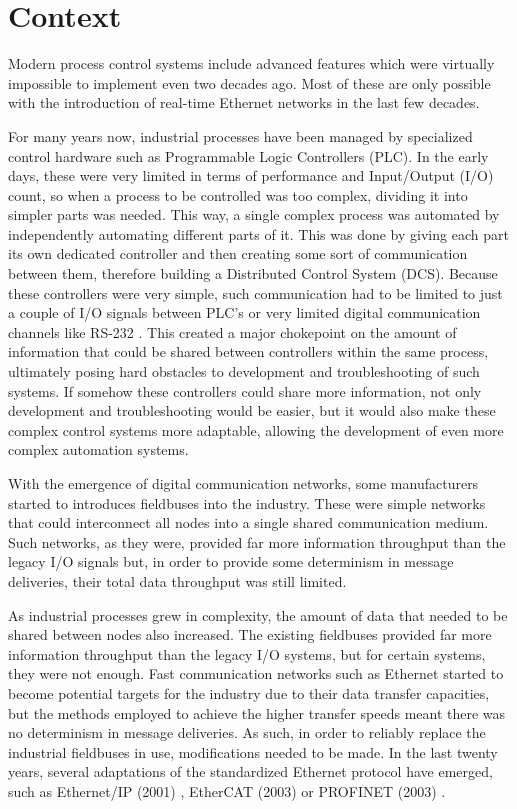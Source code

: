 \section{Context} \label{sec:context}

Modern process control systems include advanced features which were virtually impossible to implement even two decades ago.
Most of these are only possible with the introduction of real-time Ethernet networks in the last few decades.

For many years now, industrial processes have been managed by specialized control hardware such as Programmable Logic Controllers (PLC).
In the early days, these were very limited in terms of performance and Input/Output (I/O) count, so when a process to be controlled was too complex, dividing it into simpler parts was needed.
This way, a single complex process was automated by independently automating different parts of it.
This was done by giving each part its own dedicated controller and then creating some sort of communication between them, therefore building a Distributed Control System (DCS).
Because these controllers were very simple, such communication had to be limited to just a couple of I/O signals between PLC's or very limited digital communication channels like RS-232 \cite{protocol:rs232}.
This created a major chokepoint on the amount of information that could be shared between controllers within the same process, ultimately posing hard obstacles to development and troubleshooting of such systems.
If somehow these controllers could share more information, not only development and troubleshooting would be easier, but it would also make these complex control systems more adaptable, allowing the development of even more complex automation systems.

With the emergence of digital communication networks, some manufacturers started to introduces fieldbuses into the industry.
These were simple networks that could interconnect all nodes into a single shared communication medium.
Such networks, as they were, provided far more information throughput than the legacy I/O signals but, in order to provide some determinism in message deliveries, their total data throughput was still limited.

As industrial processes grew in complexity, the amount of data that needed to be shared between nodes also increased.
The existing fieldbuses provided far more information throughput than the legacy I/O systems, but for certain systems, they were not enough.
Fast communication networks such as Ethernet \cite{protocol:ethernet} started to become potential targets for the industry due to their data transfer capacities, but the methods employed to achieve the higher transfer speeds meant there was no determinism in message deliveries.
As such, in order to reliably replace the industrial fieldbuses in use, modifications needed to be made.
In the last twenty years, several adaptations of the standardized Ethernet protocol have emerged, such as Ethernet/IP (2001) \cite{protocol:ethernetip}, EtherCAT (2003) \cite{protocol:ethercat} or PROFINET (2003) \cite{protocol:profinet}.

